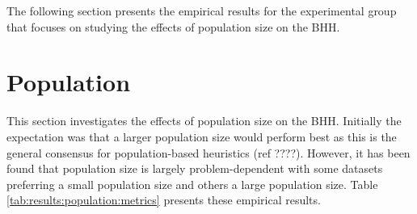 The following section presents the empirical results for the experimental group that focuses on studying the effects of population size on the \Ac{BHH}.




\section{Population}
\label{sec:results:population}

This section investigates the effects of population size on the \Ac{BHH}. Initially the expectation was that a larger population size would perform best as this is the general consensus for population-based heuristics (ref ????). However, it has been found that population size is largely problem-dependent with some datasets preferring a small population size and others a large population size. Table \ref{tab:results:population:metrics} presents these empirical results.

